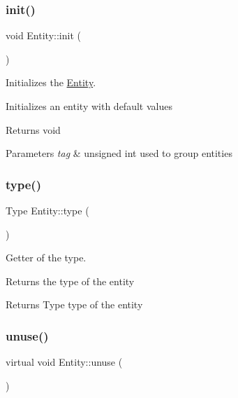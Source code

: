 \subsubsection{\texorpdfstring{init()}{init()}\hspace{0.1cm}{\footnotesize\ttfamily [2/2]}}
{\footnotesize\ttfamily void Entity\+::init (\begin{DoxyParamCaption}{ }\end{DoxyParamCaption})}



Initializes the \hyperlink{class_entity}{Entity}. 

Initializes an entity with default values

\begin{DoxyReturn}{Returns}
void 
\end{DoxyReturn}

\begin{DoxyParams}{Parameters}
{\em tag} & unsigned int used to group entities \\
\hline
\end{DoxyParams}
\mbox{\label{class_entity_a57c1ccf94325b1b771f4656178ab2b81}} 
\subsubsection{\texorpdfstring{type()}{type()}}
{\footnotesize\ttfamily Type Entity\+::type (\begin{DoxyParamCaption}{ }\end{DoxyParamCaption})}



Getter of the type. 

Returns the type of the entity

\begin{DoxyReturn}{Returns}
Type type of the entity 
\end{DoxyReturn}
\mbox{\label{class_entity_a7b87e24b0d790b2c182fad8aa572455c}} 
\subsubsection{\texorpdfstring{unuse()}{unuse()}}
{\footnotesize\ttfamily virtual void Entity\+::unuse (\begin{DoxyParamCaption}{ }\end{DoxyParamCaption})\hspace{0.3cm}{\ttfamily [virtual]}}




